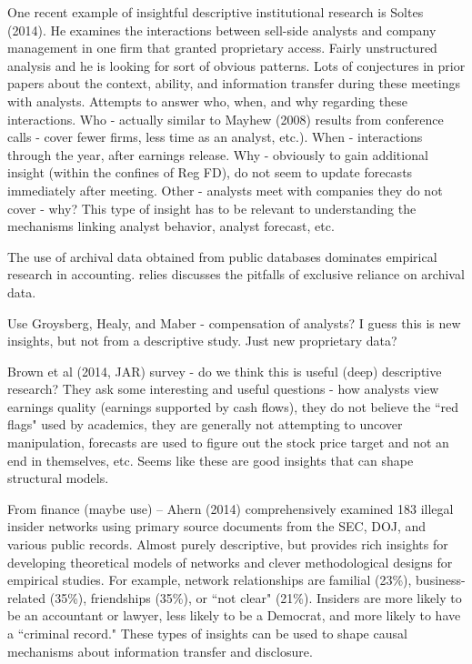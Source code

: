 \documentclass[11pt,reqno]{amsart}
\begin{document}
One recent example of insightful descriptive institutional research is Soltes (2014).  He examines the interactions between sell-side analysts and company management in one firm that granted proprietary access. 
Fairly unstructured analysis and he is looking for sort of obvious patterns.
Lots of conjectures in prior papers about the context, ability, and information transfer during these meetings with analysts.
Attempts to answer who, when, and why regarding these interactions. 
Who - actually similar to Mayhew (2008) results from conference calls - cover fewer firms, less time as an analyst, etc.).   When - interactions through the year, after earnings release. 
Why - obviously to gain additional insight (within the confines of Reg FD), do not seem to update forecasts immediately after meeting.  
Other - analysts meet with companies they do not cover - why?  This type of insight has to be relevant to understanding the mechanisms linking analyst behavior, analyst forecast, etc.

The use of archival data obtained from public databases dominates empirical research in accounting. relies \cite{Soltes:2014gr} discusses the pitfalls of exclusive reliance on archival data. 

Use Groysberg, Healy, and Maber - compensation of analysts?  I guess this is new insights, but not from a descriptive study.  Just new proprietary data?

Brown et al (2014, JAR) survey - do we think this is useful (deep) descriptive research?
They ask some interesting and useful questions - how analysts view earnings quality (earnings supported by cash flows), they do not believe the ``red flags" used by academics, they are generally not attempting to uncover manipulation, forecasts are used to figure out the stock price target and not an end in themselves, etc.
Seems like these are good insights that can shape structural models.




From finance (maybe use) -- Ahern (2014) comprehensively examined 183 illegal insider networks using primary source documents from the SEC, DOJ, and various public records.
Almost purely descriptive, but provides rich insights for developing theoretical models of networks and clever methodological designs for empirical studies.
For example, network relationships are familial (23\%), business-related (35\%), friendships (35\%), or ``not clear" (21\%).
Insiders are more likely to be an accountant or lawyer, less likely to be a Democrat, and more likely to have a ``criminal record."  These types of insights can be used to shape causal mechanisms about information transfer and disclosure.
\end{document}
